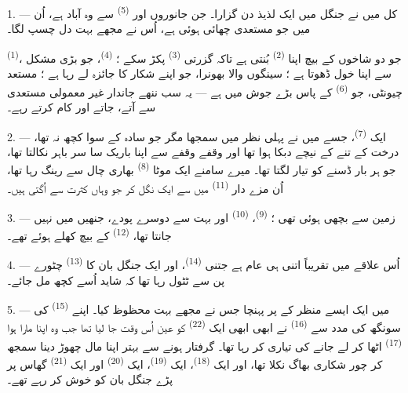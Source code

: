 \VUsaut{3.0mm}

1. --- کل میں نے جنگل میں ایک لذیذ دن گزارا۔ جن جانوروں اور
 \textsuperscript{(5)} سے وہ آباد ہے، اُن میں جو
مستعدی چھائی ہوئی ہے، اُس نے مجھے بہت دل چسپ لگا۔

 \textsuperscript{(1)}، جو دو شاخوں کے بیچ اپنا
 \textsuperscript{(2)} بُنتی ہے تاکہ گزرتی
 \textsuperscript{(3)} پکڑ سکے ؛ 
\textsuperscript{(4)}، جو بڑی مشکل سے اپنا خول ڈھوتا ہے ؛ سینگوں والا
بھونرا، جو اپنے شکار کا جائزہ لے رہا ہے ؛ مستعد چیونٹی، جو
 \textsuperscript{(6)} کے پاس بڑے جوش میں ہے —
یہ سب ننھے جاندار غیر معمولی مستعدی سے آتے، جاتے اور کام کرتے رہے۔

2. --- ایک  \textsuperscript{(7)}، جسے میں نے پہلی نظر
میں  سمجھا مگر جو سادہ  کے سوا کچھ نہ
تھا، درخت کے تنے کے نیچے دبکا ہوا تھا اور وقفے وقفے سے اپنا باریک سا
سر باہر نکالتا تھا، جو ہر بار ڈسنے کو تیار لگتا تھا۔ میرے سامنے ایک
موٹا  \textsuperscript{(8)} بھاری چال سے رینگ
رہا تھا، اُن مزے دار  \textsuperscript{(11)}
میں سے ایک نگل کر جو وہاں کثرت سے اُگتی ہیں۔

3. --- زمین  سے بچھی ہوئی تھی ؛
 \textsuperscript{(9)}، 
\textsuperscript{(10)} اور بہت سے دوسرے پودے، جنھیں میں نہیں جانتا
تھا،  \textsuperscript{(12)} کے بیچ کھلے ہوئے
تھے۔

4. --- اُس علاقے میں  تقریباً اتنی ہی عام ہے جتنی
 \textsuperscript{(14)}، اور ایک جنگل بان کا
 \textsuperscript{(13)} چٹورے پن سے ٹٹول رہا
تھا کہ شاید اُسے کچھ مل جائے۔

\VUsaut{3.0mm}
\VUsaut{3.0mm}

5. --- میں ایک ایسے منظر کے  پر پہنچا جس نے مجھے بہت
محظوظ کیا۔ اپنے  \textsuperscript{(15)} کی سونگھ کی
مدد سے  \textsuperscript{(16)} نے ابھی ابھی ایک
 \textsuperscript{(22)} کو عین اُس وقت جا لیا تھا جب
وہ اپنا مارا ہوا  \textsuperscript{(17)} اٹھا کر لے جانے
کی تیاری کر رہا تھا۔ گرفتار ہونے سے بہتر اپنا مال چھوڑ دینا سمجھ کر
چور شکاری بھاگ نکلا تھا، اور ایک 
\textsuperscript{(18)}، ایک  \textsuperscript{(19)}، ایک
 \textsuperscript{(20)} اور ایک 
\textsuperscript{(21)} گھاس پر پڑے جنگل بان کو خوش کر رہے تھے۔

